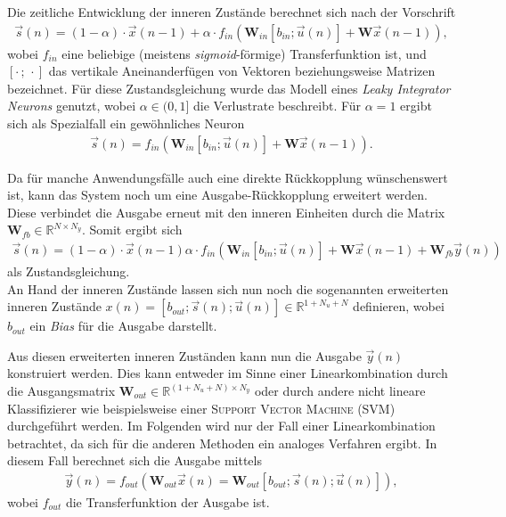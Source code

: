 Die zeitliche Entwicklung der inneren Zustände berechnet sich nach der Vorschrift
\begin{align}
\label{eq:esn_stateeq}
\vec{s}(n) = (1 - \alpha) \cdot \vec{x}(n-1)  + \alpha \cdot f_{in}\left( \mathbf{W}_{in} [b_{in}; \vec{u}(n)] + \mathbf{W} \vec{x}(n-1) \right),
\end{align}
wobei $f_{in}$ eine beliebige (meistens \textit{sigmoid}-förmige) Transferfunktion ist, und $[\cdot\,;\,\cdot]$ das vertikale Aneinanderfügen von Vektoren beziehungsweise Matrizen bezeichnet. Für diese Zustandsgleichung wurde das Modell eines \textit{Leaky Integrator Neurons} genutzt, wobei $\alpha \in (0,1]$ die Verlustrate beschreibt. Für $\alpha=1$ ergibt sich als Spezialfall ein gewöhnliches Neuron
\begin{align}
\vec{s}(n) = f_{in}\left( \mathbf{W}_{in} [b_{in}; \vec{u}(n)] + \mathbf{W} \vec{x}(n-1) \right).
\end{align}

Da für manche Anwendungsfälle auch eine direkte Rückkopplung wünschenswert ist, kann das System noch um eine Ausgabe-Rückkopplung erweitert werden. Diese verbindet die Ausgabe erneut mit den inneren Einheiten durch die Matrix $\mathbf{W}_{fb} \in \mathbb{R}^{N \times N_y}$.
Somit ergibt sich 
\begin{align}
\label{eq:esn_stateeq_feedback}
\vec{s}(n) = (1 - \alpha) \cdot \vec{x}(n-1)  \alpha \cdot f_{in}\left( \mathbf{W}_{in} [b_{in}; \vec{u}(n)] + \mathbf{W} \vec{x}(n-1) + \mathbf{W}_{fb} \vec{y}(n) \right)
\end{align}
als Zustandsgleichung.\\

An Hand der inneren Zustände lassen sich nun noch die sogenannten erweiterten inneren Zustände $x(n) = [b_{out}; \vec{s}(n); \vec{u}(n)] \in \mathbb{R}^{1 + N_u + N}$ definieren, wobei $b_{out}$ ein \textit{Bias} für die Ausgabe darstellt. 

Aus diesen erweiterten inneren Zuständen kann nun die Ausgabe $\vec{y}(n)$ konstruiert werden. Dies kann entweder im Sinne einer Linearkombination durch die Ausgangsmatrix $\mathbf{W}_{out} \in \mathbb{R}^{(1 + N_u + N) \times N_y}$ oder durch andere nicht lineare Klassifizierer wie beispielsweise einer \textsc{Support Vector Machine (SVM)} durchgeführt werden. Im Folgenden wird nur der Fall einer Linearkombination betrachtet, da sich für die anderen Methoden ein analoges Verfahren ergibt.
In diesem Fall berechnet sich die Ausgabe mittels
\begin{align}
\vec{y}(n) = f_{out} \left( \mathbf{W}_{out} \vec{x}(n) = \mathbf{W}_{out} [b_{out}; \vec{s}(n); \vec{u}(n)] \right),
\end{align}
wobei $f_{out}$ die Transferfunktion der Ausgabe ist.\\

